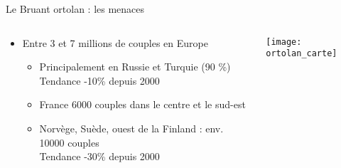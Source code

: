 \message{ !name(cours_DIE_ONIRIS_Suivi_populations_oiseaux.tex)}\documentclass[10pt]{beamer}
\begin{document}
\begin{frame}{Le Bruant ortolan : les menaces}
    \begin{columns}[c]
    \begin{column}[c]{0.5\textwidth}
      \begin{itemize}[<+->]
      \item Entre 3 et 7 millions de couples en Europe
        \begin{itemize}
        \item Principalement en Russie et Turquie (90 \%) \\
          Tendance -10\% depuis 2000
        \item France 6000 couples dans le centre et le sud-est
        \item Norvège, Suède, ouest de la Finland : env. 10000
          couples \\
          Tendance -30\% depuis 2000 
       \end{itemize}
     \end{itemize}
    \end{column}
    \begin{column}[c]{0.5\textwidth}
      \begin{center}
          \texttt{[image: ortolan\_carte]}
      \end{center}
    \end{column}
  \end{columns}
\end{frame}
\end{document}
